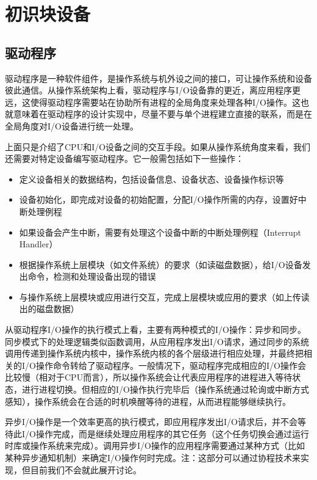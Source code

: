 \chapter{初识块设备}
\section{驱动程序}

驱动程序是一种软件组件，是操作系统与机外设之间的接口，可让操作系统和设备彼此通信。从操作系统架构上看，驱动程序与I/O设备靠的更近，离应用程序更远，这使得驱动程序需要站在协助所有进程的全局角度来处理各种I/O操作。这也就意味着在驱动程序的设计实现中，尽量不要与单个进程建立直接的联系，而是在全局角度对I/O设备进行统一处理。
	
上面只是介绍了CPU和I/O设备之间的交互手段。如果从操作系统角度来看，我们还需要对特定设备编写驱动程序。它一般需包括如下一些操作：
	
\begin{itemize}
	\item 定义设备相关的数据结构，包括设备信息、设备状态、设备操作标识等
	\item 设备初始化，即完成对设备的初始配置，分配I/O操作所需的内存，设置好中断处理例程
	\item 如果设备会产生中断，需要有处理这个设备中断的中断处理例程（Interrupt Handler）
	\item 根据操作系统上层模块（如文件系统）的要求（如读磁盘数据），给I/O设备发出命令，检测和处理设备出现的错误
	\item 与操作系统上层模块或应用进行交互，完成上层模块或应用的要求（如上传读出的磁盘数据）
\end{itemize}
	
从驱动程序I/O操作的执行模式上看，主要有两种模式的I/O操作：异步和同步。同步模式下的处理逻辑类似函数调用，从应用程序发出I/O请求，通过同步的系统调用传递到操作系统内核中，操作系统内核的各个层级进行相应处理，并最终把相关的I/O操作命令转给了驱动程序。一般情况下，驱动程序完成相应的I/O操作会比较慢（相对于CPU而言），所以操作系统会让代表应用程序的进程进入等待状态，进行进程切换。但相应的I/O操作执行完毕后（操作系统通过轮询或中断方式感知），操作系统会在合适的时机唤醒等待的进程，从而进程能够继续执行。
		
异步I/O操作是一个效率更高的执行模式，即应用程序发出I/O请求后，并不会等待此I/O操作完成，而是继续处理应用程序的其它任务（这个任务切换会通过运行时库或操作系统来完成）。调用异步I/O操作的应用程序需要通过某种方式（比如某种异步通知机制）来确定I/O操作何时完成。注：这部分可以通过协程技术来实现，但目前我们不会就此展开讨论。
	
